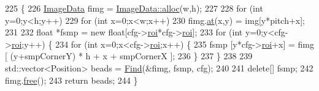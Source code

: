 \begin{DoxyCode}
225 \{
226     \hyperlink{struct_t_image_data}{ImageData} fimg = \hyperlink{struct_t_image_data_a8ae528964e70c0d0a98b8481cc8b083e}{ImageData::alloc}(w,h);
227 
228     \textcolor{keywordflow}{for} (\textcolor{keywordtype}{int} y=0;y<h;y++)
229         \textcolor{keywordflow}{for} (\textcolor{keywordtype}{int} x=0;x<w;x++) 
230             fimg.\hyperlink{struct_t_image_data_ad13c1527ffabe17b997c38090ec5e6b9}{at}(x,y) = img[y*pitch+x];
231 
232     \textcolor{keywordtype}{float} *fsmp = \textcolor{keyword}{new} \textcolor{keywordtype}{float}[cfg->\hyperlink{struct_bead_finder_1_1_config_afd0fcc1cea252dc5c64d98d3df23887e}{roi}*cfg->\hyperlink{struct_bead_finder_1_1_config_afd0fcc1cea252dc5c64d98d3df23887e}{roi}];
233     \textcolor{keywordflow}{for} (\textcolor{keywordtype}{int} y=0;y<cfg->\hyperlink{struct_bead_finder_1_1_config_afd0fcc1cea252dc5c64d98d3df23887e}{roi};y++) \{
234         \textcolor{keywordflow}{for} (\textcolor{keywordtype}{int} x=0;x<cfg->\hyperlink{struct_bead_finder_1_1_config_afd0fcc1cea252dc5c64d98d3df23887e}{roi};x++) \{
235             fsmp [y*cfg->\hyperlink{struct_bead_finder_1_1_config_afd0fcc1cea252dc5c64d98d3df23887e}{roi}+x] = fimg [ (y+smpCornerY) * h + x + smpCornerX ];
236         \}
237     \}
238 
239     std::vector<Position> beads = \hyperlink{namespace_bead_finder_ab23a6df0dccd8f6af8e78f79d2f05b69}{Find}(&fimg, fsmp, cfg);
240 
241     \textcolor{keyword}{delete}[] fsmp;
242     fimg.\hyperlink{struct_t_image_data_a60a60e309657216a2e35809fdc582b11}{free}();
243     \textcolor{keywordflow}{return} beads;
244 \}
\end{DoxyCode}
